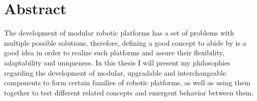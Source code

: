 \chapter*{Abstract}
The development of modular robotic platforms has a set of problems with multiple possible solutions, therefore, defining a good concept to abide by is a good idea in order to realize such platforms and assure their flexibility, adaptability and uniqueness. In this thesis I will present my philosophies regarding the development of modular, upgradable and interchangeable components to form certain families of robotic platforms, as well as using them together to test different related concepts and emergent behavior between them.      



